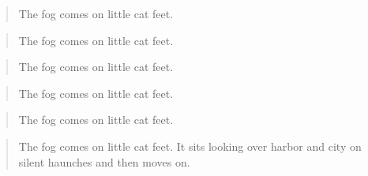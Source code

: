 \begin{verse}
The fog comes
on little cat feet.
\end{verse}

\begin{verse}
The fog comes
on little cat feet.
\end{verse}

\begin{verse}
The fog comes
on little cat feet.
\end{verse}

\begin{verse}
The fog comes
on little cat feet.
\end{verse}

\begin{verse}
The fog comes
on little cat feet.
\end{verse}

\begin{verse}
The fog comes
on little cat feet.
It sits looking
over harbor and city
on silent haunches
and then moves on.
\end{verse}

